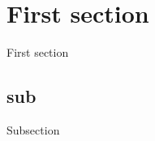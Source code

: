 \documentclass{article}
\numberwithin{equation}{section}
\theoremstyle{definition}
\begin{document}



\tableofcontents
\newpage



\section{First section}
First section
\subsection{sub}
Subsection


\end{document}
